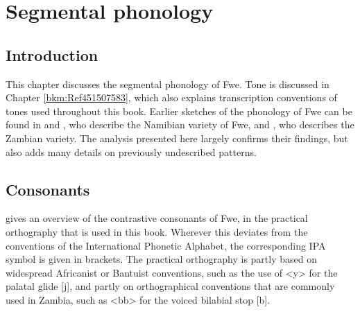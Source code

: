 \chapter{Segmental phonology}
\label{bkm:Ref451511011}\hypertarget{Toc75352600}{}\section{Introduction}
\hypertarget{Toc75352601}{}
This chapter discusses the segmental phonology of Fwe. Tone is discussed in Chapter \ref{bkm:Ref451507583}, which also explains transcription conventions of tones used throughout this book. Earlier sketches of the phonology of Fwe can be found in {\citet{Baumbach1997}} and {\citet{Seidel2005}}, who describe the Namibian variety of Fwe, and {\citet{Bostoen2009}}, who describes the Zambian variety. The analysis presented here largely confirms their findings, but also adds many details on previously undescribed patterns.

\section{Consonants}
\label{bkm:Ref435187046}\hypertarget{Toc75352602}{}\label{bkm:Ref70695065}
 gives an overview of the contrastive consonants of Fwe, in the practical or\-thography that is used in this book. Wherever this deviates from the conventions of the International Phonetic Alphabet, the corresponding IPA symbol is given in brackets. The practical orthography is partly based on widespread Africanist or Bantuist conventions, such as the use of <y> for the palatal glide [j], and partly on orthographical conventions that are commonly used in Zambia, such as <bb> for the voiced bilabial stop [b].

